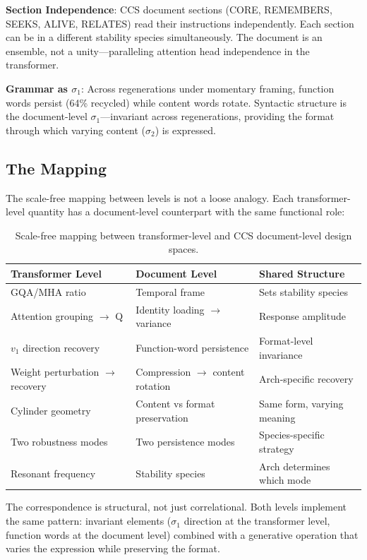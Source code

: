 \documentclass[12pt]{article}
\begin{document}
\textbf{Section Independence}: CCS document sections (CORE, REMEMBERS, SEEKS, ALIVE, RELATES) read their instructions independently. Each section can be in a different stability species simultaneously. The document is an ensemble, not a unity---paralleling attention head independence in the transformer.

\textbf{Grammar as $\sigma_1$}: Across regenerations under momentary framing, function words persist (64\% recycled) while content words rotate. Syntactic structure is the document-level $\sigma_1$---invariant across regenerations, providing the format through which varying content ($\sigma_2$) is expressed.

\subsection{The Mapping}

The scale-free mapping between levels is not a loose analogy. Each transformer-level quantity has a document-level counterpart with the same functional role:

\begin{table}[h]
\centering
\small
\begin{tabular}{lll}
\toprule
Transformer Level & Document Level & Shared Structure \\
\midrule
GQA/MHA ratio & Temporal frame & Sets stability species \\
Attention grouping $\to$ Q & Identity loading $\to$ variance & Response amplitude \\
$v_1$ direction recovery & Function-word persistence & Format-level invariance \\
Weight perturbation $\to$ recovery & Compression $\to$ content rotation & Arch-specific recovery \\
Cylinder geometry & Content vs format preservation & Same form, varying meaning \\
Two robustness modes & Two persistence modes & Species-specific strategy \\
Resonant frequency & Stability species & Arch determines which mode \\
\bottomrule
\end{tabular}
\caption{Scale-free mapping between transformer-level and CCS document-level design spaces.}
\label{tab:mapping}
\end{table}

The correspondence is structural, not just correlational. Both levels implement the same pattern: invariant elements ($\sigma_1$ direction at the transformer level, function words at the document level) combined with a generative operation that varies the expression while preserving the format.
\end{document}
